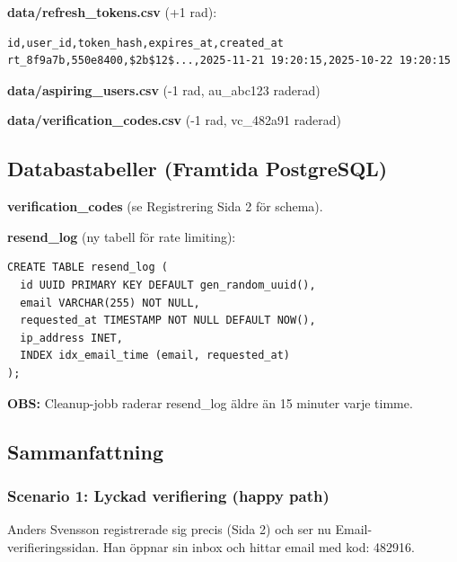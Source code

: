 \documentclass[12pt,a4paper]{article}
\begin{document}
\textbf{data/refresh\_tokens.csv} (+1 rad):
\begin{verbatim}
id,user_id,token_hash,expires_at,created_at
rt_8f9a7b,550e8400,$2b$12$...,2025-11-21 19:20:15,2025-10-22 19:20:15
\end{verbatim}

\textbf{data/aspiring\_users.csv} (-1 rad, au\_abc123 raderad)

\textbf{data/verification\_codes.csv} (-1 rad, vc\_482a91 raderad)

\subsection{Databastabeller (Framtida PostgreSQL)}

\textbf{verification\_codes} (se Registrering Sida 2 för schema).

\textbf{resend\_log} (ny tabell för rate limiting):
\begin{lstlisting}
CREATE TABLE resend_log (
  id UUID PRIMARY KEY DEFAULT gen_random_uuid(),
  email VARCHAR(255) NOT NULL,
  requested_at TIMESTAMP NOT NULL DEFAULT NOW(),
  ip_address INET,
  INDEX idx_email_time (email, requested_at)
);
\end{lstlisting}

\textbf{OBS:} Cleanup-jobb raderar resend\_log äldre än 15 minuter varje timme.


\subsection{Sammanfattning}

\subsubsection{Scenario 1: Lyckad verifiering (happy path)}
Anders Svensson registrerade sig precis (Sida 2) och ser nu Email-verifieringssidan. Han öppnar sin inbox och hittar email med kod: 482916.
\end{document}
